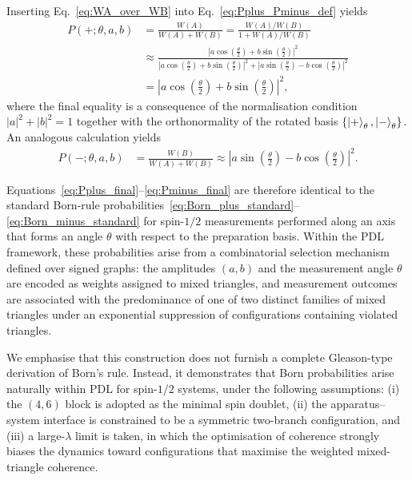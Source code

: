 \documentclass[11pt,a4paper]{article}
\numberwithin{equation}{section}
\begin{document}
Inserting Eq.~\eqref{eq:WA_over_WB} into Eq.~\eqref{eq:Pplus_Pminus_def} yields
\begin{align}
  P(+;\theta,a,b)
  &= \frac{W(A)}{W(A)+W(B)}
   = \frac{W(A)/W(B)}{1+W(A)/W(B)} \\
   &\approx
   \frac{ \left|a\cos\left(\tfrac{\theta}{2}\right) + b\sin\left(\tfrac{\theta}{2}\right)\right|^2 }
        { \left|a\cos\left(\tfrac{\theta}{2}\right) + b\sin\left(\tfrac{\theta}{2}\right)\right|^2
         +\left|a\sin\left(\tfrac{\theta}{2}\right) - b\cos\left(\tfrac{\theta}{2}\right)\right|^2 }
  \nonumber\\[0.4em]
  &=
   \left|a\cos\left(\tfrac{\theta}{2}\right) + b\sin\left(\tfrac{\theta}{2}\right)\right|^2,
  \label{eq:Pplus_final}
\end{align}
where the final equality is a consequence of the normalisation condition $|a|^2+|b|^2=1$ together with the orthonormality of the rotated basis $\{\ket{+}_\theta,\ket{-}_\theta\}$. An analogous calculation yields
\begin{align}
  P(-;\theta,a,b)
  &= \frac{W(B)}{W(A)+W(B)}
  \approx
   \left|a\sin\left(\tfrac{\theta}{2}\right) - b\cos\left(\tfrac{\theta}{2}\right)\right|^2.
  \label{eq:Pminus_final}
\end{align}

Equations~\eqref{eq:Pplus_final}--\eqref{eq:Pminus_final} are therefore identical to the standard Born-rule probabilities~\eqref{eq:Born_plus_standard}--\eqref{eq:Born_minus_standard} for spin-$1/2$ measurements performed along an axis that forms an angle $\theta$ with respect to the preparation basis. Within the PDL framework, these probabilities arise from a combinatorial selection mechanism defined over signed graphs: the amplitudes $(a,b)$ and the measurement angle $\theta$ are encoded as weights assigned to mixed triangles, and measurement outcomes are associated with the predominance of one of two distinct families of mixed triangles under an exponential suppression of configurations containing violated triangles.

We emphasise that this construction does not furnish a complete Gleason-type derivation of Born’s rule. Instead, it demonstrates that Born probabilities arise naturally within PDL for spin-$1/2$ systems, under the following assumptions: (i) the $(4,6)$ block is adopted as the minimal spin doublet, (ii) the apparatus–system interface is constrained to be a symmetric two-branch configuration, and (iii) a large-$\lambda$ limit is taken, in which the optimisation of coherence strongly biases the dynamics toward configurations that maximise the weighted mixed-triangle coherence.
\end{document}
